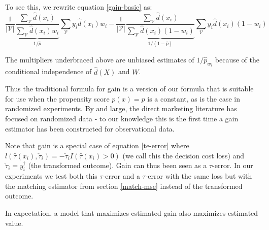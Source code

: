 To see this, we rewrite equation \ref{gain-basic} as:
\[
	 \dfrac{1}{|\mathcal V |} \underbrace{ \frac{ \sum_{\mathcal{V}} \hat d(x_i)}{\sum_{\mathcal{V}}  \hat d(x_i) w_i} }_{1/\hat p}
		  	\sum_{\mathcal{V}} y_i  \hat d(x_i) w_i - 
		\dfrac{1}{|\mathcal V |}  \underbrace{ \frac{ \sum_{\mathcal{V}} \hat d(x_i)}{\sum_{\mathcal{V}}  \hat d(x_i)  (1-w_i)} }_{1/ (1-\hat p)}
		  	\sum_{\mathcal{V}} y_i  \hat d(x_i) (1-w_i) 
\]

The multipliers underbraced above are unbiased estimates of $1/\hat p_{w_i}$ because of the conditional independence of $\hat d(X)$ and $W$. 

Thus the traditional formula for gain is a version of our formula that is suitable for use when the propensity score $p(x) = p$ is a constant, as is the case in randomized experiments. By and large, the direct marketing literature has focused on randomized data - to our knowledge this is the first time a gain estimator has been constructed for observational data. 

Note that gain is a special case of equation \ref{te-error} where $l(\hat \tau (x_i), \check \tau_i) = -\check \tau_i  I(\hat \tau (x_i) > 0)$ (we call this the decision cost loss) and $\check\tau_i = y_i^{\dagger}$ (the transformed outcome). Gain can thus been seen as a $\tau$-error. In our experiments we test both this $\tau$-error and  a $\tau$-error with the same loss but with the matching estimator from section \ref{match-mse} instead of the transformed outcome.

\begin{theorem}
\label{gain-value}
In expectation, a model that maximizes estimated gain also maximizes estimated value.
\end{theorem}

